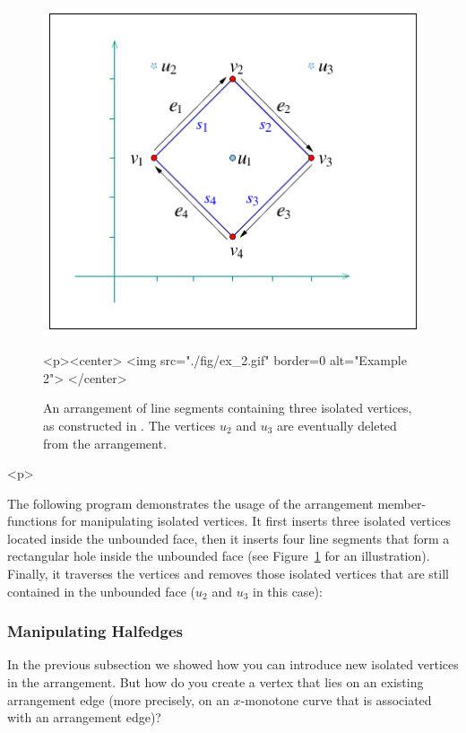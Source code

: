 \begin{figure}[!htp]
\begin{ccTexOnly}
  \begin{center}
  \includegraphics{Arrangement_2/fig/ex_2}
  \end{center}
\end{ccTexOnly}
\begin{ccHtmlOnly}
  <p><center>
  <img src="./fig/ex_2.gif" border=0 alt="Example 2">
  </center>
\end{ccHtmlOnly}
\caption{An arrangement of line segments containing three isolated
vertices, as constructed in . The vertices $u_2$
and $u_3$ are eventually deleted from the arrangement.}
\label{arr_fig:ex_2}
\end{figure}

\begin{ccHtmlOnly}<p>\end{ccHtmlOnly}
The following program demonstrates the usage of the arrangement
member-functions for manipulating isolated vertices. It first
inserts three isolated vertices located inside the unbounded face, then
it inserts four line segments that form a rectangular hole inside the
unbounded face (see Figure~\ref{arr_fig:ex_2} for an
illustration). Finally, it traverses the vertices and removes those
isolated vertices that are still contained in the unbounded face
($u_2$ and $u_3$ in this case):


\subsubsection{Manipulating Halfedges}
\label{arr_sssec:mf_halfedges}
%
In the previous subsection we showed how you can introduce new isolated
vertices in the arrangement. But how do you create a vertex that
lies on an existing arrangement edge (more precisely, on an
$x$-monotone curve that is associated with an arrangement edge)?

